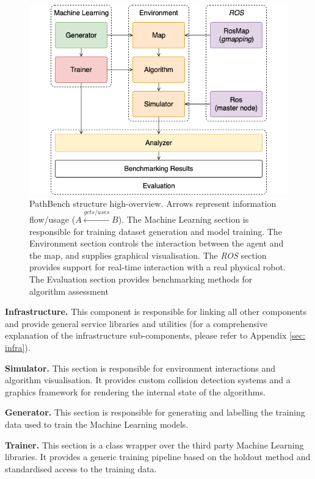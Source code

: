 \begin{figure}[h!]
    \centering
    \includegraphics[scale=0.5]{images/sim_high_overview.png}
    \caption{PathBench structure high-overview. Arrows represent information flow/usage ($A \xleftarrow{gets/uses} B$). The Machine Learning section is responsible for training dataset generation and model training. The Environment section controls the interaction between the agent and the map, and supplies graphical visualisation. The \textit{ROS} section provides support for real-time interaction with a real physical robot. The Evaluation section provides benchmarking methods for algorithm assessment}
    \label{fig: sim_platform}
\end{figure}

\textbf{Infrastructure.} This component is responsible for linking all other components and provide general service libraries and utilities (for a comprehensive explanation of the infrastructure sub-components, please refer to Appendix \ref{sec: infra}).

\pagebreak

\textbf{Simulator.} This section is responsible for environment interactions and algorithm visualisation. It provides custom collision detection systems and a graphics framework for rendering the internal state of the algorithms.

\textbf{Generator.} This section is responsible for generating and labelling the training data used to train the Machine Learning models.

\textbf{Trainer.} This section is a class wrapper over the third party Machine Learning libraries. It provides a generic training pipeline based on the holdout method and standardised access to the training data.


